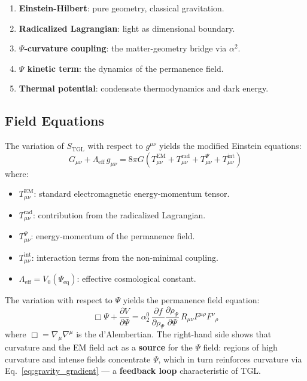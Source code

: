 \documentclass[12pt,a4paper,twoside]{article}
\newcommand{\alphaii}{\alpha^{2}}
\newcommand{\Psifield}{\Psi}
\begin{document}
\begin{enumerate}[nosep]
\item \textbf{Einstein-Hilbert}: pure geometry, classical gravitation.
\item \textbf{Radicalized Lagrangian}: light as dimensional boundary.
\item \textbf{$\Psifield$-curvature coupling}: the matter-geometry bridge via $\alphaii$.
\item \textbf{$\Psifield$ kinetic term}: the dynamics of the permanence field.
\item \textbf{Thermal potential}: condensate thermodynamics and dark energy.
\end{enumerate}



\subsection{Field Equations}

The variation of $S_{\text{TGL}}$ with respect to $g^{\mu\nu}$ yields the modified Einstein equations:
\begin{equation}
G_{\mu\nu} + \Lambda_{\text{eff}}\, g_{\mu\nu} = 8\pi G\left(T_{\mu\nu}^{\text{EM}} + T_{\mu\nu}^{\text{rad}} + T_{\mu\nu}^{\Psifield} + T_{\mu\nu}^{\text{int}}\right)
\label{eq:modified_einstein}
\end{equation}
where:
\begin{itemize}[nosep]
\item $T_{\mu\nu}^{\text{EM}}$: standard electromagnetic energy-momentum tensor.
\item $T_{\mu\nu}^{\text{rad}}$: contribution from the radicalized Lagrangian.
\item $T_{\mu\nu}^{\Psifield}$: energy-momentum of the permanence field.
\item $T_{\mu\nu}^{\text{int}}$: interaction terms from the non-minimal coupling.
\item $\Lambda_{\text{eff}} = V_0(\Psifield_{\text{eq}})$: effective cosmological constant.
\end{itemize}

The variation with respect to $\Psifield$ yields the permanence field equation:
\begin{equation}
\Box\Psifield + \frac{\partial V}{\partial\Psifield} = \alpha_2^{0}\, \frac{\partial f}{\partial\rho_\Psifield}\frac{\partial\rho_\Psifield}{\partial\Psifield}\, R_{\mu\nu}F^{\mu\rho}F^{\nu}{}_{\rho}
\label{eq:psi_field_equation}
\end{equation}
where $\Box = \nabla_\mu\nabla^\mu$ is the d'Alembertian. The right-hand side shows that curvature and the EM field act as a \textbf{source} for the $\Psifield$ field: regions of high curvature and intense fields concentrate $\Psifield$, which in turn reinforces curvature via Eq.~\eqref{eq:gravity_gradient} --- a \textbf{feedback loop} characteristic of TGL.
\end{document}
